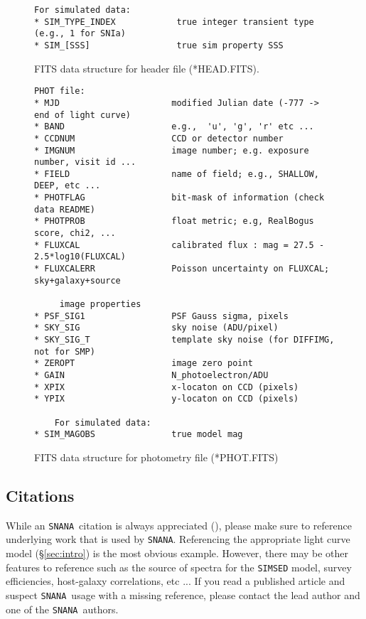 \documentclass[12pt]{article}
\newcommand{\snana}{{\tt SNANA}}
\begin{document}
{\begin{figure} [ht]
\begin{center}
\begin{Verbatim}[frame=single]
     For simulated data:
* SIM_TYPE_INDEX            true integer transient type (e.g., 1 for SNIa)
* SIM_[SSS]                 true sim property SSS
\end{Verbatim}
\end{center}
\vspace{-0.5cm}
\caption{
  FITS data structure for header file (*HEAD.FITS).
 }
\label{fig:data_format_head}
\end{figure}
%
%
\begin{figure} [ht] 
\begin{center}
\begin{Verbatim}[frame=single]
PHOT file:
* MJD                      modified Julian date (-777 -> end of light curve)
* BAND                     e.g.,  'u', 'g', 'r' etc ...
* CCDNUM                   CCD or detector number
* IMGNUM                   image number; e.g. exposure number, visit id ...
* FIELD                    name of field; e.g., SHALLOW, DEEP, etc ...
* PHOTFLAG                 bit-mask of information (check data README)
* PHOTPROB                 float metric; e.g, RealBogus score, chi2, ...
* FLUXCAL                  calibrated flux : mag = 27.5 - 2.5*log10(FLUXCAL)
* FLUXCALERR               Poisson uncertainty on FLUXCAL; sky+galaxy+source

     image properties
* PSF_SIG1                 PSF Gauss sigma, pixels
* SKY_SIG                  sky noise (ADU/pixel)
* SKY_SIG_T                template sky noise (for DIFFIMG, not for SMP)
* ZEROPT                   image zero point
* GAIN                     N_photoelectron/ADU
* XPIX                     x-locaton on CCD (pixels)
* YPIX                     y-locaton on CCD (pixels)

    For simulated data:
* SIM_MAGOBS               true model mag
\end{Verbatim}
\end{center}
\vspace{-0.5cm}
\caption{
  FITS data structure for photometry file (*PHOT.FITS)
 }
\label{fig:data_format_phot}
\end{figure}

\bigskip\bigskip

\subsection{Citations}
\label{subsec:cite}

While an \snana\ citation is always appreciated
(\cite{SNANA09}), please make sure to reference 
underlying work that is used by \snana.
Referencing the appropriate light curve model 
(\S\ref{sec:intro}) is the most obvious example.
However, there may be other features to reference such as 
the source of spectra for the {\tt SIMSED} model,
survey efficiencies,
host-galaxy correlations, 
etc ...
If you read a published article and suspect \snana\ usage 
with a missing reference, please contact the lead author
and one of the \snana\ authors.

}
\end{document}
